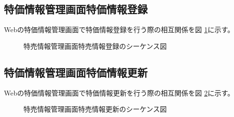 \documentclass[a4j]{jarticle}
\begin{document}
\subsection{特価情報管理画面特価情報登録}
Webの特価情報管理画面で特価情報登録を行う際の相互関係を図 \ref {tab:oonishi23}に示す。
\begin{figure}[hb]
\begin{center}
\caption{特売情報管理画面特売情報登録のシーケンス図}
\label{tab:oonishi23}
\end{center}
\end{figure}
\subsection{特価情報管理画面特価情報更新}
Webの特価情報管理画面で特価情報更新を行う際の相互関係を図 \ref {tab:oonishi24}に示す。
\begin{figure}[hb]
\begin{center}
\caption{特売情報管理画面特売情報更新のシーケンス図}
\label{tab:oonishi24}
\end{center}
\end{figure}
\end{document}
